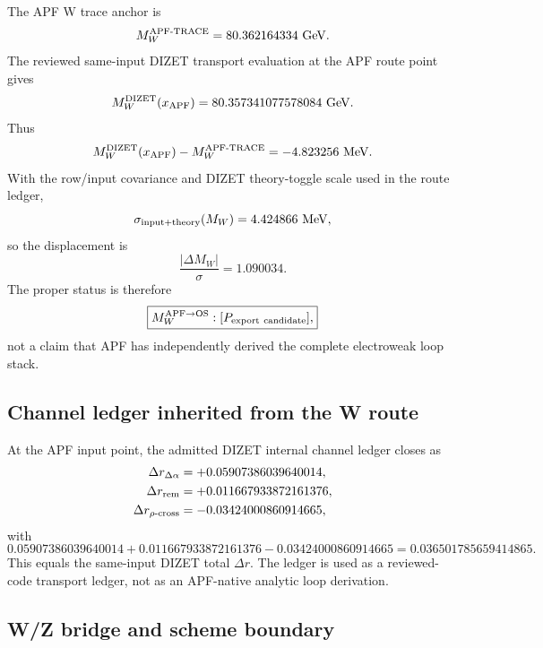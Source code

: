 The APF W trace anchor is
\begin{equation}
  M_W^{\rm APF\text{-}TRACE}=80.362164334\ {\rm GeV}.
\end{equation}
The reviewed same-input DIZET transport evaluation at the APF route point gives
\begin{equation}
  M_W^{\rm DIZET}(x_{\rm APF})=80.357341077578084\ {\rm GeV}.
\end{equation}
Thus
\begin{equation}
  M_W^{\rm DIZET}(x_{\rm APF})-M_W^{\rm APF\text{-}TRACE}
  =-4.823256\ {\rm MeV}.
\end{equation}
With the row/input covariance and DIZET theory-toggle scale used in the route ledger,
\begin{equation}
  \sigma_{\rm input+theory}(M_W)=4.424866\ {\rm MeV},
\end{equation}
so the displacement is
\begin{equation}
  \frac{|\Delta M_W|}{\sigma}=1.090034.
\end{equation}
The proper status is therefore
\begin{equation}
  \boxed{M_W^{\rm APF\to OS}:[P_{\rm export\ candidate}],}
\end{equation}
not a claim that APF has independently derived the complete electroweak loop stack.

\subsection{Channel ledger inherited from the W route}

At the APF input point, the admitted DIZET internal channel ledger closes as
\begin{align}
  \Delta r_{\Delta\alpha} &= +0.05907386039640014,\\
  \Delta r_{\rm rem} &= +0.011667933872161376,\\
  \Delta r_{\rho\text{-}{\rm cross}} &= -0.03424000860914665,
\end{align}
with
\begin{equation}
  0.05907386039640014
  +0.011667933872161376
  -0.03424000860914665
  =0.036501785659414865.
\end{equation}
This equals the same-input DIZET total \(\Delta r\).  The ledger is used as a reviewed-code transport ledger, not as an APF-native analytic loop derivation.

\subsection{W/Z bridge and scheme boundary}

